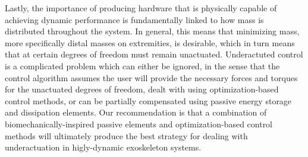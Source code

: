 \documentclass[letterpaper,12pt,fullpage]{article}
\begin{document}
Lastly, the importance of producing hardware that is physically capable of achieving dynamic performance is fundamentally linked to how mass is distributed throughout the system.  In general, this means that minimizing mass, more specifically distal masses on extremities, is desirable, which in turn means that at certain degrees of freedom must remain unactuated.  Underactuted control is a complicated problem which can either be ignored, in the sense that the control algorithm assumes the user will provide the necessary forces and torques for the unactuated degrees of freedom, dealt with using optimization-based control methods, or can be partially compensated using passive energy storage and dissipation elements.  Our recommendation is that a combination of biomechanically-inspired passive elements and optimization-based control methods will ultimately produce the best strategy for dealing with underactuation in higly-dynamic exoskeleton systems.



%


\newpage


\end{document}
